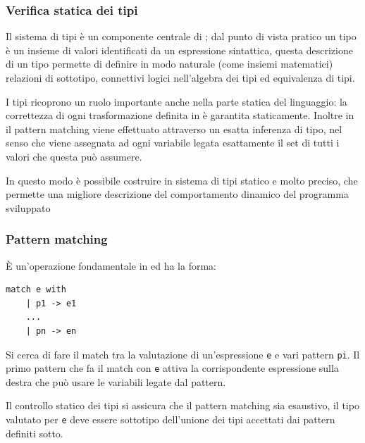 \subsubsection{Verifica statica dei tipi}
Il sistema di tipi è un componente centrale di \cduce; dal punto di vista pratico un tipo è un insieme di valori identificati da un espressione sintattica, questa descrizione di un tipo permette di definire in modo naturale (come insiemi matematici) relazioni di sottotipo, connettivi logici nell'algebra dei tipi ed equivalenza di tipi.

I tipi ricoprono un ruolo importante anche nella parte statica del linguaggio: la correttezza di ogni trasformazione definita in \cduce è garantita staticamente. Inoltre in \cduce il pattern matching viene effettuato attraverso un esatta inferenza di tipo, nel senso che viene assegnata ad ogni variabile legata esattamente il set di tutti i valori che questa può assumere.

In questo modo è possibile costruire in sistema di tipi statico e molto preciso, che permette una migliore descrizione del comportamento dinamico del programma sviluppato
\subsubsection{Pattern matching}
\label{CDucePattern}
È un'operazione fondamentale in \cduce ed ha la forma:
\begin{verbatim}
match e with
	| p1 -> e1
	...
	| pn -> en
\end{verbatim}
Si cerca di fare il match tra la valutazione di un'espressione \verb|e| e vari pattern \verb|pi|. Il primo pattern che fa il match con \verb|e| attiva la corrispondente espressione sulla destra che può usare le variabili legate dal pattern.

Il controllo statico dei tipi si assicura che il pattern matching sia esaustivo, il tipo valutato per \verb|e| deve essere sottotipo dell'unione dei tipi accettati dai pattern definiti sotto.
